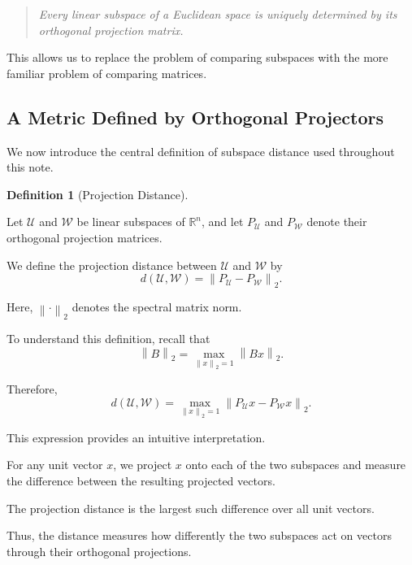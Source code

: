 \documentclass[14pt,letterpaper]{article}
\theoremstyle{plain}
\theoremstyle{definition}
\newtheorem{definition}[theorem]{Definition}
\theoremstyle{remark}
\newcommand{\R}{\mathbb{R}}
\newcommand{\norm}[1]{\left\lVert #1 \right\rVert}
\begin{document}
\begin{quote}
\emph{
Every linear subspace of a
Euclidean space is uniquely
determined by its orthogonal
projection matrix.
}
\end{quote}

This allows us to replace
the problem of comparing
subspaces with the more
familiar problem of
comparing matrices.


\subsection{A Metric Defined by Orthogonal Projectors}
\label{subsec:projector_metric}

We now introduce the central
definition of subspace distance
used throughout this note.

\begin{definition}[Projection Distance]
\label{def:projection_distance}

Let $\mathcal U$ and $\mathcal W$
be linear subspaces of $\R^n$,
and let $P_{\mathcal U}$ and
$P_{\mathcal W}$ denote their
orthogonal projection matrices.

We define the projection distance
between $\mathcal U$ and
$\mathcal W$ by
\[
\boxed{
d(\mathcal U,\mathcal W)
=
\norm{
P_{\mathcal U}-P_{\mathcal W}
}_2.
}
\]

Here, $\norm{\cdot}_2$ denotes
the spectral matrix norm.

\end{definition}

To understand this definition,
recall that
\[
\norm{B}_2
=
\max_{\norm{x}_2=1}\norm{Bx}_2.
\]

Therefore,
\[
\boxed{
d(\mathcal U,\mathcal W)
=
\max_{\norm{x}_2=1}
\norm{
P_{\mathcal U}x-P_{\mathcal W}x
}_2.
}
\]

This expression provides an
intuitive interpretation.

For any unit vector $x$,
we project $x$ onto each of
the two subspaces and measure
the difference between the
resulting projected vectors.

The projection distance is
the largest such difference
over all unit vectors.

Thus, the distance measures
how differently the two
subspaces act on vectors
through their orthogonal
projections.
\end{document}
